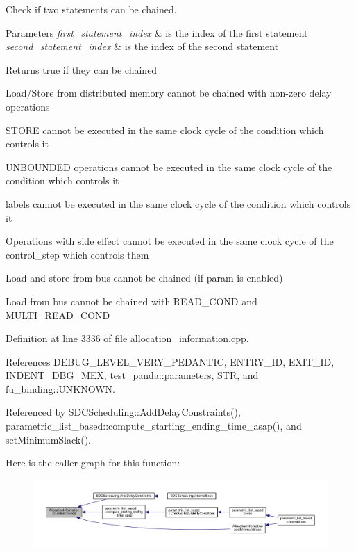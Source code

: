 Check if two statements can be chained. 


\begin{DoxyParams}{Parameters}
{\em first\+\_\+statement\+\_\+index} & is the index of the first statement \\
\hline
{\em second\+\_\+statement\+\_\+index} & is the index of the second statement \\
\hline
\end{DoxyParams}
\begin{DoxyReturn}{Returns}
true if they can be chained 
\end{DoxyReturn}
Load/\+Store from distributed memory cannot be chained with non-\/zero delay operations

S\+T\+O\+RE cannot be executed in the same clock cycle of the condition which controls it

U\+N\+B\+O\+U\+N\+D\+ED operations cannot be executed in the same clock cycle of the condition which controls it

labels cannot be executed in the same clock cycle of the condition which controls it

Operations with side effect cannot be executed in the same clock cycle of the control\+\_\+step which controls them

Load and store from bus cannot be chained (if param is enabled)

Load from bus cannot be chained with R\+E\+A\+D\+\_\+\+C\+O\+ND and M\+U\+L\+T\+I\+\_\+\+R\+E\+A\+D\+\_\+\+C\+O\+ND 

Definition at line 3336 of file allocation\+\_\+information.\+cpp.



References D\+E\+B\+U\+G\+\_\+\+L\+E\+V\+E\+L\+\_\+\+V\+E\+R\+Y\+\_\+\+P\+E\+D\+A\+N\+T\+IC, E\+N\+T\+R\+Y\+\_\+\+ID, E\+X\+I\+T\+\_\+\+ID, I\+N\+D\+E\+N\+T\+\_\+\+D\+B\+G\+\_\+\+M\+EX, test\+\_\+panda\+::parameters, S\+TR, and fu\+\_\+binding\+::\+U\+N\+K\+N\+O\+WN.



Referenced by S\+D\+C\+Scheduling\+::\+Add\+Delay\+Constraints(), parametric\+\_\+list\+\_\+based\+::compute\+\_\+starting\+\_\+ending\+\_\+time\+\_\+asap(), and set\+Minimum\+Slack().

Here is the caller graph for this function\+:
\nopagebreak
\begin{figure}[H]
\begin{center}
\leavevmode
\includegraphics[width=350pt]{d7/d79/classAllocationInformation_ab38098c58dccc26bf6c3b8b948376911_icgraph}
\end{center}
\end{figure}
\mbox{\label{classAllocationInformation_a25d00c0d07725618b0e3e9de287b4fc9}} 
